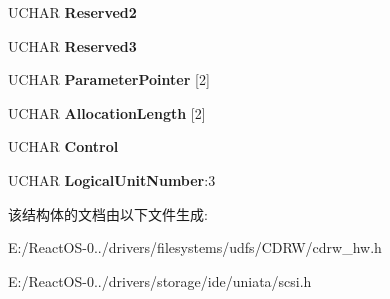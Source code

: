 \begin{DoxyCompactItemize}
U\+C\+H\+AR {\bfseries Reserved2}
\item 
\mbox{\label{struct___c_d_b_1_1___l_o_g_s_e_n_s_e_a92f74cc93a35457a38a8637b0384da71}} 
U\+C\+H\+AR {\bfseries Reserved3}
\item 
\mbox{\label{struct___c_d_b_1_1___l_o_g_s_e_n_s_e_a4140ff3c8a5eaa72bcd02b13f6011ca4}} 
U\+C\+H\+AR {\bfseries Parameter\+Pointer} \mbox{[}2\mbox{]}
\item 
\mbox{\label{struct___c_d_b_1_1___l_o_g_s_e_n_s_e_a84a38f4202fe25eeed07e4712df232c5}} 
U\+C\+H\+AR {\bfseries Allocation\+Length} \mbox{[}2\mbox{]}
\item 
\mbox{\label{struct___c_d_b_1_1___l_o_g_s_e_n_s_e_a0662c48f42ea37c755995dca63d3ee02}} 
U\+C\+H\+AR {\bfseries Control}
\item 
\mbox{\label{struct___c_d_b_1_1___l_o_g_s_e_n_s_e_a5f128ea0bfec6716f9b7a7f65a28a243}} 
U\+C\+H\+AR {\bfseries Logical\+Unit\+Number}\+:3
\end{DoxyCompactItemize}


该结构体的文档由以下文件生成\+:\begin{DoxyCompactItemize}
\item 
E\+:/\+React\+O\+S-\/0../drivers/filesystems/udfs/\+C\+D\+R\+W/cdrw\+\_\+hw.\+h\item 
E\+:/\+React\+O\+S-\/0../drivers/storage/ide/uniata/scsi.\+h\end{DoxyCompactItemize}
